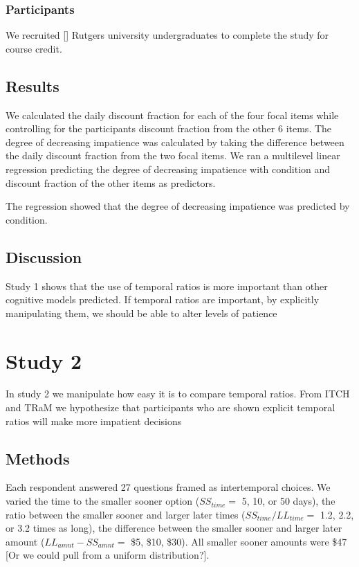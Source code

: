 \documentclass[]{article}
\begin{document}
\subsubsection{Participants}

We recruited [] Rutgers university undergraduates to complete the study for course credit. 

\subsection{Results}
 
We calculated the daily discount fraction for each of the four focal items while controlling for the participants discount fraction from the other 6 items. 
The degree of decreasing impatience was calculated by taking the difference between the daily discount fraction from the two focal items. 
We ran a multilevel linear regression predicting the degree of decreasing impatience with condition and discount fraction of the other items as predictors. 

The regression showed that the degree of decreasing impatience was predicted by condition.  

\subsection{Discussion}

Study 1 shows that the use of temporal ratios is more important than other cognitive models predicted. 
If temporal ratios are important, by explicitly manipulating them, we should be able to alter levels of patience

\section{Study 2}

In study 2 we manipulate how easy it is to compare temporal ratios. 
From ITCH and TRaM we hypothesize that participants who are shown explicit temporal ratios will make more impatient decisions 

\subsection{Methods}

Each respondent answered 27 questions framed as intertemporal choices.
We varied the time to the smaller sooner option ($SS_{time} =$ 5, 10, or 50 days), 
the ratio between the smaller sooner and larger later times ($SS_{time} / LL_{time}  = $ 1.2, 2.2, or 3.2 times as long), 
 the difference between the smaller sooner and larger later amount ($LL_{amnt} - SS_{amnt} =$ \$5, \$10, \$30). All smaller sooner amounts were \$47 [Or we could pull from a uniform distribution?].
\end{document}
